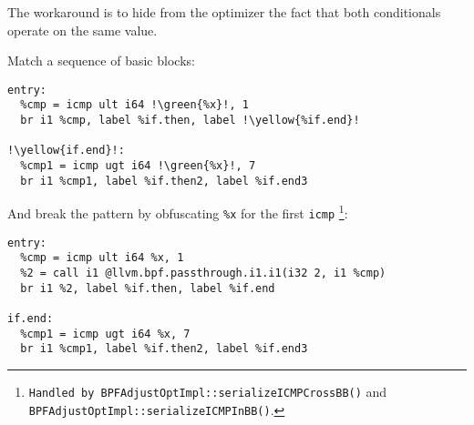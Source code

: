 \documentclass{beamer}
\newcommand{\code}[1]{\texttt{#1}}
\newcommand{\marker}[2]{\colorbox{#1}{#2}}
\newcommand{\green }[1]{\marker{SpringGreen!40}{#1}}
\newcommand{\yellow}[1]{\marker{Goldenrod!40}{#1}}
\begin{document}
\begin{frame}
The workaround is to hide from the optimizer the fact that both
conditionals operate on the same value.

Match a sequence of basic blocks:

\begin{verbatim}
entry:
  %cmp = icmp ult i64 !\green{%x}!, 1
  br i1 %cmp, label %if.then, label !\yellow{%if.end}!

!\yellow{if.end}!:
  %cmp1 = icmp ugt i64 !\green{%x}!, 7
  br i1 %cmp1, label %if.then2, label %if.end3
\end{verbatim}

  \framebreak

  And break the pattern by obfuscating \code{\%x} for the first
  \code{icmp} \footnote{\tiny{\parbox{\textwidth}{
        \code{Handled by BPFAdjustOptImpl::serializeICMPCrossBB()} and\\
        \code{BPFAdjustOptImpl::serializeICMPInBB()}. }}}:

  \vspace{0.5cm}

\begin{verbatim}
entry:
  %cmp = icmp ult i64 %x, 1
  %2 = call i1 @llvm.bpf.passthrough.i1.i1(i32 2, i1 %cmp)
  br i1 %2, label %if.then, label %if.end

if.end:
  %cmp1 = icmp ugt i64 %x, 7
  br i1 %cmp1, label %if.then2, label %if.end3
\end{verbatim}
    
\end{frame}
\end{document}
